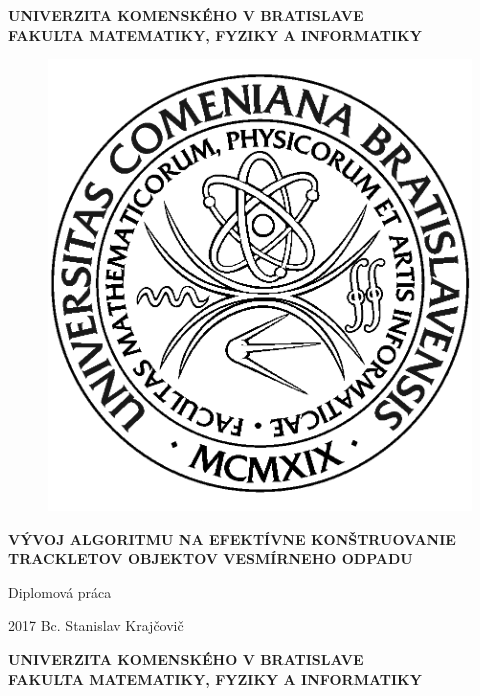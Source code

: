 \documentclass[12pt, a4paper, oneside]{book}
\newcommand\mftitle{Vývoj algoritmu na efektívne konštruovanie trackletov objektov vesmírneho odpadu}
\newcommand\mfthesistype{Diplomová práca}
\newcommand\mfauthor{Bc. Stanislav Krajčovič}
\newcommand\mfuniversity{UNIVERZITA KOMENSKÉHO V BRATISLAVE}
\newcommand\mffaculty{FAKULTA MATEMATIKY, FYZIKY A INFORMATIKY}
\begin{document}
\frontmatter

\thispagestyle{empty}

\noindent
\begin{minipage}{\textwidth}
\begin{center}
\textbf{\mfuniversity \\
\mffaculty}
\end{center}
\end{minipage}

\vfill
\begin{figure}[!hbt]
	\begin{center}
		\includegraphics{images/logo_fmph}
		\label{img:logo}
	\end{center}
\end{figure}
\begin{center}
	\begin{minipage}{0.8\textwidth}
		\centerline{\textbf{\Large\MakeUppercase{\mftitle}}}
		\smallskip
		\centerline{\mfthesistype}
	\end{minipage}
\end{center}
\vfill
2017 \hfill
\mfauthor
\eject 

\thispagestyle{empty}

\noindent
\begin{minipage}{\textwidth}
\begin{center}
\textbf{\mfuniversity \\
\mffaculty}
\end{center}
\end{minipage}
\end{document}

